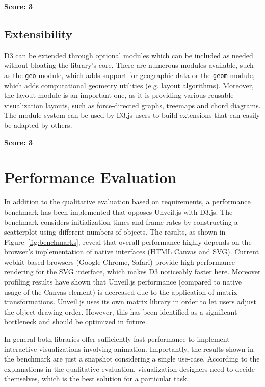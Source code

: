 \SuperPar \textbf{Score: 3}

\subsection{Extensibility}

D3 can be extended through optional modules which can be included as needed without bloating the library's core. There are numerous modules available, such as the \texttt{geo} module, which adds support for geographic data or the \texttt{geom} module, which adds computational geometry utilities (e.g. layout algorithms). Moreover, the layout module is an important one, as it is providing various reusable visualization layouts, such as force-directed graphs, treemaps and chord diagrams. The module system can be used by D3.js users to build extensions that can easily be adapted by others.

\SuperPar \textbf{Score: 3}


\section{Performance Evaluation}

In addition to the qualitative evaluation based on requirements, a performance benchmark has been implemented that opposes Unveil.js with D3.js. 
The benchmark considers initialization times and frame rates by constructing a scatterplot using different numbers of objects. The results, as shown in Figure~\ref{fig:benchmarks}, reveal that overall performance highly depends on the browser's implementation of native interfaces (HTML Canvas and SVG). Current webkit-based browsers (Google Chrome, Safari) provide high performance rendering for the SVG interface, which makes D3 noticeably faster here. Moreover profiling results have shown that Unveil.js performance (compared to native usage of the Canvas element) is decreased due to the application of matrix transformations. Unveil.js uses its own matrix library in order to let users adjust the object drawing order. However, this has been identified as a significant bottleneck and should be optimized in future.

In general both libraries offer sufficiently fast performance to implement interactive visualizations involving animation. Importantly, the results shown in the benchmark are just a snapshot considering a single use-case. According to the explanations in the qualitative evaluation, visualization designers need to decide themselves, which is the best solution for a particular task.


